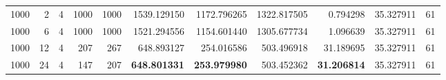 \begin{table}
\begin{tabular}{rrrrrrrrrrr}
1000 & 2 & 4 & 1000 & 1000 & 1539.129150 & 1172.796265 & 1322.817505 & 0.794298 & 35.327911 & 61 \\
1000 & 6 & 4 & 1000 & 1000 & 1521.294556 & 1154.601440 & 1305.677734 & 1.096639 & 35.327911 & 61 \\
1000 & 12 & 4 & 207 & 267 & 648.893127 & 254.016586 & 503.496918 & 31.189695 & 35.327911 & 61 \\
1000 & 24 & 4 & 147 & 207 & \textbf{648.801331} & \textbf{253.979980} & 503.452362 & \textbf{31.206814} & 35.327911 & 61 \\
\bottomrule
\end{tabular}
\end{table}

